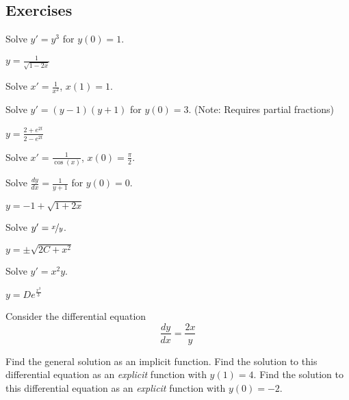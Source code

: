 \subsection{Exercises}

\begin{exercise}
Solve $y' = y^3$ for $y(0)=1$.
\end{exercise}
\comboSol{%
}
{%
$y = \frac{1}{\sqrt{1-2x}}$
}

\begin{exercise}\ansMark%
Solve $x' = \frac{1}{x^2}$, $x(1)=1$.
\end{exercise}


\begin{exercise}
Solve $y' = (y-1)(y+1)$ for $y(0)=3$. (Note: Requires partial fractions)
\end{exercise}
\comboSol{%
}
{%
$y = \frac{2 + e^{2t}}{2 - e^{2t}}$
}

\begin{exercise}\ansMark%
Solve $x' = \frac{1}{\cos(x)}$, $x(0)=\frac{\pi}{2}$.
\end{exercise}


\begin{exercise}
Solve $\frac{dy}{dx} = \frac{1}{y+1}$ for $y(0)=0$.
\end{exercise}
\comboSol{%
}
{%
$y = -1 + \sqrt{1+2x}$
}

\begin{exercise}
Solve $y' = \nicefrac{x}{y}$.
\end{exercise}
\comboSol{%
}
{%
$y = \pm \sqrt{2C + x^2}$
}

\begin{exercise}
Solve $y' = x^2y$.
\end{exercise}
\comboSol{%
}
{%
$y = De^{\frac{x^3}{3}}$
}

\begin{exercise}\ansMark%
Consider the differential equation \[ \frac{dy}{dx} = \frac{2x}{y} \]
\begin{tasks}
\task Find the general solution as an implicit function.
\task Find the solution to this differential equation as an \emph{explicit} function with $y(1) = 4$.
\task Find the solution to this differential equation as an \emph{explicit} function with $y(0) = -2$. 
\end{tasks}
\end{exercise}


